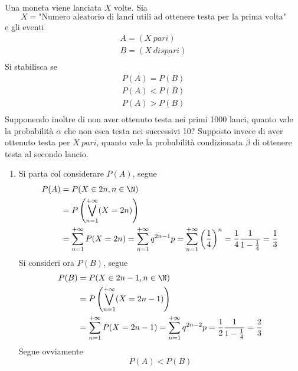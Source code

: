 \documentclass{subfiles}
\begin{document}
\begin{Example*}
    Una moneta viene lanciata \(X\) volte.
    Sia
    \[
        X = \text{"Numero aleatorio di lanci utili ad ottenere testa per la prima volta"}
    \]
    e gli eventi
    \[\begin{gathered}
            A = (X \ pari) \\
            B = (X \ dispari) \\
        \end{gathered}\]
    Si stabilisca se
    \[\begin{gathered}
            P(A) = P(B) \\
            P(A) < P(B) \\
            P(A) > P(B) \\
        \end{gathered}\]
    Supponendo inoltre di non aver ottenuto testa nei primi 1000 lanci, quanto vale la probabilità \(\alpha\) che non esca testa nei successivi 10?
    Supposto invece di aver ottenuto testa per \(X \ pari\), quanto vale la probabilità condizionata \(\beta\) di ottenere testa al secondo lancio.

    \begin{enumerate}
        \item Si parta col considerare \(P(A)\), segue
              \[\begin{aligned}
                      P(A) & = P(X \in 2n, n \in \N)                                                                                                                                                                                         \\
                           & = P\left(\bigvee\limits_{n = 1}^{+ \infty} (X = 2n)\right)                                                                                                                                                      \\
                           & = \sum\limits_{n = 1}^{+ \infty}{P(X = 2n)}  = \sum\limits_{n = 1}^{+ \infty}{q^{2n - 1}p} = \sum\limits_{n = 1}^{+ \infty}{\left(\frac{1}{4}\right)^{n}} = \frac{1}{4} \frac{1}{1 - \frac{1}{4}} = \frac{1}{3}
                  \end{aligned}\]
              Si consideri ora \(P(B)\), segue
              \[\begin{aligned}
                      P(B) & = P(X \in 2n - 1, n\in \N)                                                                                                                          \\
                           & = P\left(\bigvee\limits_{n = 1}^{+ \infty} (X = 2n - 1)\right)                                                                                      \\
                           & = \sum\limits_{n = 1}^{+ \infty}{P(X = 2n - 1)} = \sum\limits_{n = 1}^{+ \infty}{q^{2n - 2}p} = \frac{1}{2} \frac{1}{1 - \frac{1}{4}} = \frac{2}{3}
                  \end{aligned}\]
              Segue ovviamente
              \[
                  P(A) < P(B)
              \]


\end{enumerate}
\end{Example*}
\end{document}
